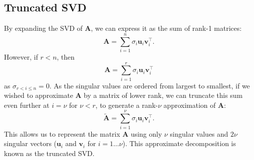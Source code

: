 \documentclass{article}
\begin{document}
\subsection{Truncated SVD}
By expanding the SVD of \(\symbf{A}\), we can express it as the sum of
rank-1 matrices:
\begin{equation*}
    \symbf{A} = \sum_{i = 1}^n \sigma_i \symbf{u}_i \symbf{v}^\top_i.
\end{equation*}
However, if \(r < n\), then
\begin{equation*}
    \symbf{A} = \sum_{i = 1}^r \sigma_i \symbf{u}_i \symbf{v}^\top_i
\end{equation*}
as \(\sigma_{r < i \leq n} = 0\). As the singular values are ordered from largest to smallest, if we wished to approximate \(\symbf{A}\)
by a matrix of lower rank, we can truncate this sum even further at \(i = \nu\) for \(\nu < r\), to generate a rank-\(\nu\) approximation of \(\symbf{A}\):
\begin{equation*}
    \tilde{\symbf{A}} = \sum_{i = 1}^\nu \sigma_i \symbf{u}_i \symbf{v}^\top_i.
\end{equation*}
This allows us to represent the matrix \(\symbf{A}\) using only \(\nu\) singular values and \(2\nu\) singular vectors
(\(\symbf{u}_i\) and \(\symbf{v}_i\) for \(i = 1 \ldots \nu\)). This approximate decomposition is known as the truncated SVD\@.
\end{document}
